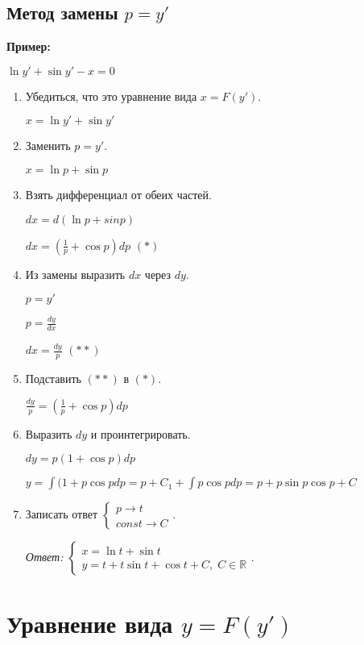 \documentclass[10pt, a4paper]{article}
\begin{document}
\subsection{Метод замены $p = y'$}
\textbf{Пример:}
\par $\ln{y'} + \sin{y'} - x = 0$
\begin{enumerate}
    \item Убедиться, что это уравнение вида $x = F(y')$.
        \par $x = \ln{y'} + \sin{y'}$
    \item Заменить $p = y'$.
        \par $x = \ln{p} + \sin{p}$
    \item Взять дифференциал от обеих частей.
        \par $dx = d(\ln{p} + sin{p})$
        \par $dx = (\frac{1}{p} + \cos{p})dp$ $(*)$
    \item Из замены выразить $dx$ через $dy$.
        \par $p = y'$
        \par $p = \frac{dy}{dx}$
        \par $dx = \frac{dy}{p}$ $(**)$
    \item Подставить $(**)$ в $(*)$.
        \par $\frac{dy}{p} = (\frac{1}{p} + \cos{p})dp$
    \item Выразить $dy$ и проинтегрировать.
        \par $dy = p(1 + \cos{p})dp$
        \par $y = \int{(1 + p\cos{p}dp} = p + C_1 + \int{p\cos{p}dp} = p + p\sin{p} \cos{p} + C$
    \item Записать ответ
        $\begin{cases}
            p \rightarrow t \\
            const \rightarrow C
        \end{cases}$.
        \par\textit{Ответ:}
            $\begin{cases}
                x = \ln{t} + \sin{t} \\
                y = t + t\sin{t} + \cos{t} + C,\;C \in \mathbb{R}
            \end{cases}$.
\end{enumerate}

\section{Уравнение вида $y = F(y')$}
\end{document}
